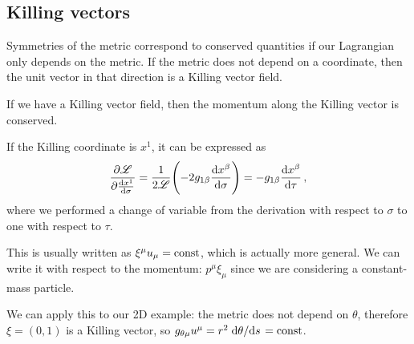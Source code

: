 \documentclass[main.tex]{subfiles}
\begin{document}
\subsection{Killing vectors}

Symmetries of the metric correspond to conserved quantities if our Lagrangian only depends on the metric.
If the metric does not depend on a coordinate, then the unit vector in that direction is a Killing vector field. 

If we have a Killing vector field, then the momentum along the Killing vector is conserved.

If the Killing coordinate is \(x^{1}\), it can be expressed as 
%
\begin{align}
  \pdv{\mathscr L}{\dv{x^{1}}{\sigma }} = \frac{1}{2 \mathscr L} \qty(-2 g_{1 \beta } \dv{x^{\beta }}{\sigma }) = - g_{1 \beta } \dv{x^{\beta }}{\tau }
\,,
\end{align}
%
where we performed a change of variable from the derivation with respect to \(\sigma \) to one with respect to \(\tau \).

This is usually written as \(\xi^{\mu } u_{\mu } = \text{const}\), which is actually more general.
We can write it with respect to the momentum: \(p^{\mu } \xi_{\mu }\) since we are considering a constant-mass particle.

We can apply this to our 2D example: the metric does not depend on \(\theta \), therefore \(\xi = (0,1)\) is a Killing vector, so \(g_{\theta \mu  } u^{\mu } = r^2 \dv*{\theta }{s} = \text{const}\).
\end{document}
